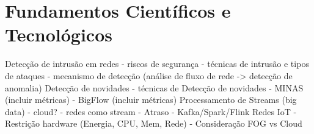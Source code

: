 
\chapter{Fundamentos Científicos e Tecnológicos}

Detecção de intrusão em redes
    - riscos de segurança
    - técnicas de intrusão e tipos de ataques
    - mecanismo de detecção (análise de fluxo de rede -> detecção de anomalia)
Detecção de novidades
    - técnicas de Detecção de novidades
    - MINAS (incluir métricas) 
    - BigFlow (incluir métricas)
Processamento de Streams (big data)
    - cloud?
    - redes como stream
    - Atraso
    - Kafka/Spark/Flink
Redes IoT
    - Restrição hardware (Energia, CPU, Mem, Rede)
    - Consideração FOG vs Cloud

